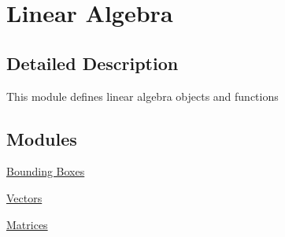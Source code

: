 \hypertarget{group___linalg_module}{}\section{Linear Algebra}
\label{group___linalg_module}


\subsection{Detailed Description}
This module defines linear algebra objects and functions \subsection*{Modules}
\begin{DoxyCompactItemize}
\item 
\hyperlink{group___bbox_module}{Bounding Boxes}
\item 
\hyperlink{group___vectors_module}{Vectors}
\item 
\hyperlink{group___matrices_module}{Matrices}
\end{DoxyCompactItemize}
